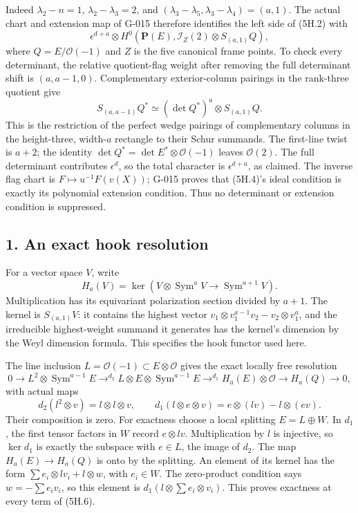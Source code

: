\documentclass[
  10pt,
]{article}
\begin{document}
Indeed \(\lambda_2-n=1\), \(\lambda_2-\lambda_3=2\), and
\((\lambda_3-\lambda_5,\lambda_3-\lambda_4)=(a,1)\). The actual chart
and extension map of G-015 therefore identifies the left side of (5H.2)
with \[
\epsilon^{d+a}\otimes
H^0(\mathbf P(E),\mathcal I_Z(2)\otimes S_{(a,1)}Q),
\tag{5H.4}
\] where \(Q=E/\mathcal O(-1)\) and \(Z\) is the five canonical frame
points. To check every determinant, the relative quotient-flag weight
after removing the full determinant shift is \((a,a-1,0)\).
Complementary exterior-column pairings in the rank-three quotient give
\[
S_{(a,a-1)}Q^*\simeq(\det Q^*)^a\otimes S_{(a,1)}Q.
\] This is the restriction of the perfect wedge pairings of
complementary columns in the height-three, width-\(a\) rectangle to
their Schur summands. The first-line twist is \(a+2\); the identity
\(\det Q^*=\det E^*\otimes\mathcal O(-1)\) leaves \(\mathcal O(2)\). The
full determinant contributes \(\epsilon^d\), so the total character is
\(\epsilon^{d+a}\), as claimed. The inverse flag chart is
\(F\mapsto u^{-1}F(v(X))\); G-015 proves that (5H.4)'s ideal condition
is exactly its polynomial extension condition. Thus no determinant or
extension condition is suppressed.

\subsection{1. An exact hook resolution}\label{an-exact-hook-resolution}

For a vector space \(V\), write \[
H_a(V)=\ker(V\otimes\operatorname{Sym}^aV
                    \longrightarrow\operatorname{Sym}^{a+1}V).
\tag{5H.5}
\] Multiplication has its equivariant polarization section divided by
\(a+1\). The kernel is \(S_{(a,1)}V\): it contains the highest vector
\(v_1\otimes v_1^{a-1}v_2-v_2\otimes v_1^a\), and the irreducible
highest-weight summand it generates has the kernel's dimension by the
Weyl dimension formula. This specifies the hook functor used here.

The line inclusion \(L=\mathcal O(-1)\subset E\otimes\mathcal O\) gives
the exact locally free resolution \[
0\to L^2\otimes\operatorname{Sym}^{a-1}E
\mathrel{\mathop{\longrightarrow}^{d_2}}
L\otimes E\otimes\operatorname{Sym}^{a-1}E
\mathrel{\mathop{\longrightarrow}^{d_1}}
H_a(E)\otimes\mathcal O\to H_a(Q)\to0,
\tag{5H.6}
\] with actual maps \[
d_2(l^2\otimes v)=l\otimes l\otimes v,\qquad
d_1(l\otimes e\otimes v)=e\otimes(lv)-l\otimes(ev).
\tag{5H.7}
\] Their composition is zero. For exactness choose a local splitting
\(E=L\oplus W\). In \(d_1\), the first tensor factors in \(W\) record
\(e\otimes lv\). Multiplication by \(l\) is injective, so \(\ker d_1\)
is exactly the subspace with \(e\in L\), the image of \(d_2\). The map
\(H_a(E)\to H_a(Q)\) is onto by the splitting. An element of its kernel
has the form \(\sum e_i\otimes lv_i+l\otimes w\), with \(e_i\in W\). The
zero-product condition says \(w=-\sum e_iv_i\), so this element is
\(d_1(l\otimes\sum e_i\otimes v_i)\). This proves exactness at every
term of (5H.6).
\end{document}
